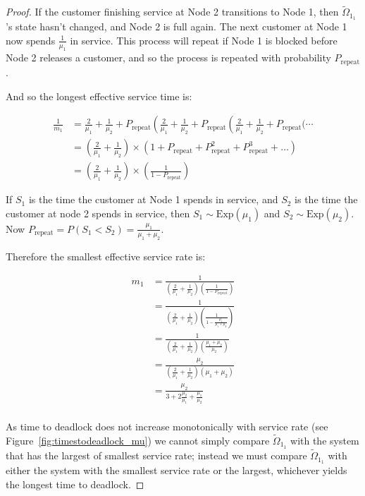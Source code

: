 \documentclass{article}
\begin{document}
\begin{proof}
If the customer finishing service at Node 2 transitions to Node 1, then $\widetilde{\Omega}_{1_1}$'s state hasn't changed, and Node 2 is full again.
The next customer at Node 1 now spends $\frac{1}{\mu_1}$ in service.
This process will repeat if Node 1 is blocked before Node 2 releases a customer, and so the process is repeated with probability $P_{\text{repeat}}$.

And so the longest effective service time is:

\begin{align*}
  \frac{1}{m_1} & = \frac{2}{\mu_1} + \frac{1}{\mu_2} + P_{\text{repeat}} \left( \frac{2}{\mu_1} + \frac{1}{\mu_2} + P_{\text{repeat}} \left( \frac{2}{\mu_1} + \frac{1}{\mu_2} + P_{\text{repeat}} \bigg( \dotsi \right. \right. \\
  & = \left( \frac{2}{\mu_1} + \frac{1}{\mu_2} \right) \times \left( 1 + P_{\text{repeat}} + P_{\text{repeat}}^2 + P_{\text{repeat}}^3 + \dots \right) \\
  & = \left( \frac{2}{\mu_1} + \frac{1}{\mu_2} \right) \times \left( \frac{1}{1 - P_{\text{repeat}}} \right)
\end{align*}

If $S_1$ is the time the customer at Node 1 spends in service, and $S_2$ is the time the customer at node 2 spends in service, then $S_1 \sim \text{Exp}(\mu_1)$ and $S_2 \sim \text{Exp}(\mu_2)$.
Now $P_{\text{repeat}} = P(S_1 < S_2) = \frac{\mu_1}{\mu_1 + \mu_2}$.

Therefore the smallest effective service rate is:

\begin{align*}
  m_1 & = \frac{1}{ \left( \frac{2}{\mu_1} + \frac{1}{\mu_2} \right) \left( \frac{1}{1-P_{\text{repeat}}} \right) } \\
  & = \frac{1}{ \left( \frac{2}{\mu_1} + \frac{1}{\mu_2} \right) \left( \frac{1}{1-\frac{\mu_1}{\mu_1 + \mu_2}} \right) } \\
  & = \frac{1}{ \left( \frac{2}{\mu_1} + \frac{1}{\mu_2} \right) \left( \frac{\mu_1 + \mu_2}{\mu_2} \right) } \\
  & = \frac{\mu_2}{ \left( \frac{2}{\mu_1} + \frac{1}{\mu_2} \right) \left( \mu_1 + \mu_2 \right) } \\
  & = \frac{\mu_2}{3 + 2\frac{\mu_2}{\mu_1} + \frac{\mu_1}{\mu_2}} \\
\end{align*}

As time to deadlock does not increase monotonically with service rate (see Figure~\ref{fig:timestodeadlock_mu}) we cannot simply compare $\widetilde{\Omega}_{1_1}$ with the system that has the largest of smallest service rate; instead we must compare $\widetilde{\Omega}_{1_1}$ with either the system with the smallest service rate or the largest, whichever yields the longest time to deadlock.


\end{proof}
\end{document}
